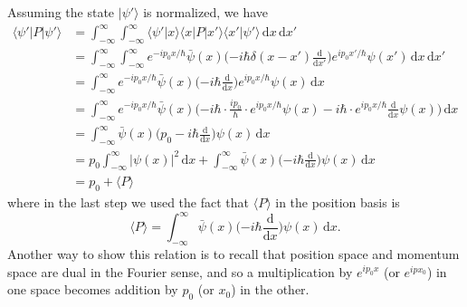 \documentclass[../principles-of-quantum-mechanics.tex]{subfiles}
\begin{document}
\begin{questions}
	\begin{solution}
		Assuming the state $|\psi'\rangle$ is normalized, we have
		\begin{align*}
			\langle \psi'|P|\psi'\rangle &= \int_{-\infty}^{\infty}\int_{-\infty}^{\infty}\langle\psi'|x\rangle\langle x|P|x'\rangle\langle x'|\psi'\rangle\,\mathrm{d}x\,\mathrm{d}x' \\
			&= \int_{-\infty}^{\infty}\int_{-\infty}^{\infty}e^{-ip_0 x/\hbar}\bar{\psi}(x)\Big({-i\hbar\delta(x - x')}\frac{\mathrm{d}}{\mathrm{d}x'}\Big)e^{ip_0x'/\hbar}\psi(x')\,\mathrm{d}x\,\mathrm{d}x' \\
			&= \int_{-\infty}^{\infty}e^{-ip_0 x/\hbar}\bar{\psi}(x)\Big({-i\hbar}\frac{\mathrm{d}}{\mathrm{d}x}\Big)e^{ip_0x/\hbar}\psi(x)\,\mathrm{d}x \\
			&= \int_{-\infty}^{\infty} e^{-ip_0x/\hbar}\bar{\psi}(x)\Big({-i\hbar}\cdot\frac{i p_0}{\hbar}\cdot e^{ip_0 x/\hbar}\psi(x) - i\hbar\cdot e^{ip_0x/\hbar}\frac{\mathrm{d}}{\mathrm{d}x}\psi(x)\Big)\,\mathrm{d}x \\
			&= \int_{-\infty}^{\infty}\bar{\psi}(x)\Big(p_0 - i\hbar\frac{\mathrm{d}}{\mathrm{d}x}\Big)\psi(x)\,\mathrm{d}x \\
			&= p_0\int_{-\infty}^{\infty}|\psi(x)|^2\,\mathrm{d}x + \int_{-\infty}^{\infty}\bar{\psi}(x)\Big({-i\hbar}\frac{\mathrm{d}}{\mathrm{d}x}\Big)\psi(x)\,\mathrm{d}x \\
			&= p_0 + \langle P\rangle
		\end{align*}
		where in the last step we used the fact that $\langle P\rangle$ in the position basis is
		$$\langle P\rangle = \int_{-\infty}^{\infty}\bar{\psi}(x)\Big({-i\hbar}\frac{\mathrm{d}}{\mathrm{d}x}\Big)\psi(x)\,\mathrm{d}x.$$
		Another way to show this relation is to recall that position space and momentum space are dual in the Fourier sense, and so a multiplication by $e^{ip_0x}$ (or $e^{ipx_0}$) in one space becomes addition by $p_0$ (or $x_0$) in the other.
	\end{solution}
	\end{questions}
\end{document}
